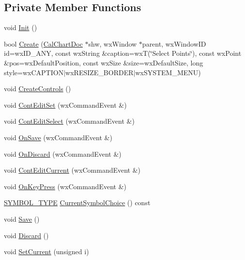 \subsection*{Private Member Functions}
\begin{DoxyCompactItemize}
\item 
void \hyperlink{a00059_a046c2c5b4d6d519c2811a41d6cfa2018}{Init} ()
\item 
bool \hyperlink{a00059_a4d9b952ecad906a4b24a3493eb1b83e8}{Create} (\hyperlink{a00020}{Cal\-Chart\-Doc} $\ast$shw, wx\-Window $\ast$parent, wx\-Window\-I\-D id=wx\-I\-D\-\_\-\-A\-N\-Y, const wx\-String \&caption=wx\-T(\char`\"{}Select Points\char`\"{}), const wx\-Point \&pos=wx\-Default\-Position, const wx\-Size \&size=wx\-Default\-Size, long style=wx\-C\-A\-P\-T\-I\-O\-N$\vert$wx\-R\-E\-S\-I\-Z\-E\-\_\-\-B\-O\-R\-D\-E\-R$\vert$wx\-S\-Y\-S\-T\-E\-M\-\_\-\-M\-E\-N\-U)
\item 
void \hyperlink{a00059_a277a8b6213a1ea0dedaa9b0b701613d9}{Create\-Controls} ()
\item 
void \hyperlink{a00059_a173b4eea37a40309145a129b7666909d}{Cont\-Edit\-Set} (wx\-Command\-Event \&)
\item 
void \hyperlink{a00059_a97a7d45a43b24a4eec9f3796e8ebbbd1}{Cont\-Edit\-Select} (wx\-Command\-Event \&)
\item 
void \hyperlink{a00059_aacfbd278347c63ba806eeced2c051dfb}{On\-Save} (wx\-Command\-Event \&)
\item 
void \hyperlink{a00059_a28ef367f2af187994960d346cc991152}{On\-Discard} (wx\-Command\-Event \&)
\item 
void \hyperlink{a00059_a6b22c9739450684689e48c92eddd93b5}{Cont\-Edit\-Current} (wx\-Command\-Event \&)
\item 
void \hyperlink{a00059_adaa335a4925f6d8ba9bfebe80ae6cc36}{On\-Key\-Press} (wx\-Command\-Event \&)
\item 
\hyperlink{a00216_a68cd84e0300be6f9ff4474682762c9ee}{S\-Y\-M\-B\-O\-L\-\_\-\-T\-Y\-P\-E} \hyperlink{a00059_a0604bd21efd58dd298f54c0412898365}{Current\-Symbol\-Choice} () const 
\item 
void \hyperlink{a00059_a068d75aa1d57737882501a34270657d5}{Save} ()
\item 
void \hyperlink{a00059_a64b741dae068c854b2710276a5499439}{Discard} ()
\item 
void \hyperlink{a00059_a708298892b3902a194c27ff5c2d25656}{Set\-Current} (unsigned i)
\end{DoxyCompactItemize}
